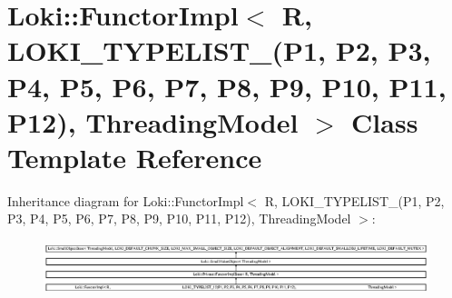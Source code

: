 \hypertarget{classLoki_1_1FunctorImpl_3_01R_00_01_01_01_01_01_01_01_01_01_01_01_01_01_01_01_01_01_01_01_01_017c788c46fcb2e521ccdf7053452b5922}{}\section{Loki\+:\+:Functor\+Impl$<$ R, L\+O\+K\+I\+\_\+\+T\+Y\+P\+E\+L\+I\+S\+T\+\_(P1, P2, P3, P4, P5, P6, P7, P8, P9, P10, P11, P12), Threading\+Model $>$ Class Template Reference}
\label{classLoki_1_1FunctorImpl_3_01R_00_01_01_01_01_01_01_01_01_01_01_01_01_01_01_01_01_01_01_01_01_017c788c46fcb2e521ccdf7053452b5922}
Inheritance diagram for Loki\+:\+:Functor\+Impl$<$ R, L\+O\+K\+I\+\_\+\+T\+Y\+P\+E\+L\+I\+S\+T\+\_(P1, P2, P3, P4, P5, P6, P7, P8, P9, P10, P11, P12), Threading\+Model $>$\+:\begin{figure}[H]
\begin{center}
\leavevmode
\includegraphics[height=1.579690cm]{classLoki_1_1FunctorImpl_3_01R_00_01_01_01_01_01_01_01_01_01_01_01_01_01_01_01_01_01_01_01_01_017c788c46fcb2e521ccdf7053452b5922}
\end{center}
\end{figure}
